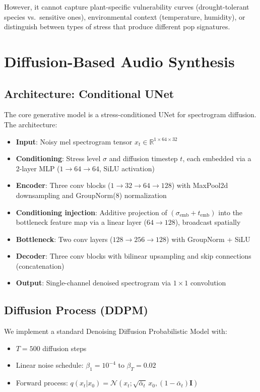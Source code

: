 \documentclass[11pt,a4paper,twocolumn]{article}
\begin{document}
However, it cannot capture plant-specific vulnerability curves (drought-tolerant species vs.\ sensitive ones), environmental context (temperature, humidity), or distinguish between types of stress that produce different pop signatures.


\section{Diffusion-Based Audio Synthesis}
\label{sec:diffusion}

\subsection{Architecture: Conditional UNet}

The core generative model is a stress-conditioned UNet for spectrogram diffusion. The architecture:

\begin{itemize}[nosep]
    \item \textbf{Input}: Noisy mel spectrogram tensor $x_t \in \mathbb{R}^{1 \times 64 \times 32}$
    \item \textbf{Conditioning}: Stress level $\sigma$ and diffusion timestep $t$, each embedded via a 2-layer MLP ($1 \to 64 \to 64$, SiLU activation)
    \item \textbf{Encoder}: Three conv blocks ($1 \to 32 \to 64 \to 128$) with MaxPool2d downsampling and GroupNorm(8) normalization
    \item \textbf{Conditioning injection}: Additive projection of $(\sigma_{\text{emb}} + t_{\text{emb}})$ into the bottleneck feature map via a linear layer ($64 \to 128$), broadcast spatially
    \item \textbf{Bottleneck}: Two conv layers ($128 \to 256 \to 128$) with GroupNorm + SiLU
    \item \textbf{Decoder}: Three conv blocks with bilinear upsampling and skip connections (concatenation)
    \item \textbf{Output}: Single-channel denoised spectrogram via $1\times1$ convolution
\end{itemize}

\subsection{Diffusion Process (DDPM)}

We implement a standard Denoising Diffusion Probabilistic Model \cite{ho2020ddpm} with:
\begin{itemize}[nosep]
    \item $T = 500$ diffusion steps
    \item Linear noise schedule: $\beta_1 = 10^{-4}$ to $\beta_T = 0.02$
    \item Forward process: $q(x_t | x_0) = \mathcal{N}(x_t; \sqrt{\bar{\alpha}_t}\, x_0, (1 - \bar{\alpha}_t) \mathbf{I})$
\end{itemize}
\end{document}
